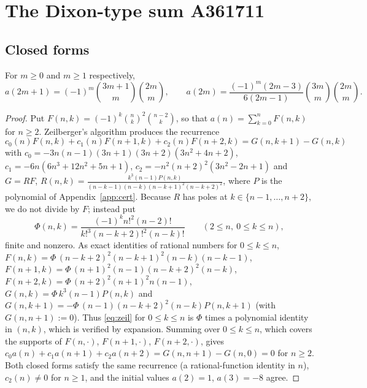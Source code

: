 \documentclass[11pt]{amsart}
\begin{document}
\section{The Dixon-type sum A361711}\label{sec:dixon}

\subsection{Closed forms}
\begin{lemma}\label{lem:closed}
For $m\ge0$ and $m\ge1$ respectively,
\[ a(2m+1)=(-1)^m\binom{3m+1}{m}\binom{2m}{m},\qquad a(2m)=\frac{(-1)^m(2m-3)}{6(2m-1)}\binom{3m}{m}\binom{2m}m. \]
\end{lemma}
\begin{proof}
Put $F(n,k)=(-1)^k\binom nk^2\binom{n-2}k$, so that $a(n)=\sum_{k=0}^nF(n,k)$ for $n\ge2$. Zeilberger's algorithm \cite{pwz1996} produces the recurrence
\begin{equation}\label{eq:zeil}
c_0(n)F(n,k)+c_1(n)F(n+1,k)+c_2(n)F(n+2,k)=G(n,k+1)-G(n,k)
\end{equation}
with $c_0=-3n(n-1)(3n+1)(3n+2)(3n^2+4n+2)$, $c_1=-6n(6n^3+12n^2+5n+1)$, $c_2=-n^2(n+2)^2(3n^2-2n+1)$ and $G=RF$, $R(n,k)=\frac{k^3(n-1)P(n,k)}{(n-k-1)(n-k)(n-k+1)^2(n-k+2)^2}$, where $P$ is the polynomial of Appendix~\ref{app:cert}. Because $R$ has poles at $k\in\{n-1,\dots,n+2\}$, we do not divide by $F$; instead put
\[ \Phi(n,k)=\frac{(-1)^kn!^2(n-2)!}{k!^3(n-k+2)!^2(n-k)!}\qquad(2\le n,\ 0\le k\le n), \]
finite and nonzero. As exact identities of rational numbers for $0\le k\le n$,
$F(n,k)=\Phi\,(n-k+2)^2(n-k+1)^2(n-k)(n-k-1)$, $F(n+1,k)=\Phi\,(n+1)^2(n-1)(n-k+2)^2(n-k)$, $F(n+2,k)=\Phi\,(n+2)^2(n+1)^2n(n-1)$, $G(n,k)=\Phi\,k^3(n-1)P(n,k)$ and $G(n,k+1)=-\Phi\,(n-1)(n-k+2)^2(n-k)P(n,k+1)$ (with $G(n,n+1):=0$). Thus \eqref{eq:zeil} for $0\le k\le n$ is $\Phi$ times a polynomial identity in $(n,k)$, which is verified by expansion. Summing over $0\le k\le n$, which covers the supports of $F(n,\cdot)$, $F(n+1,\cdot)$, $F(n+2,\cdot)$, gives $c_0a(n)+c_1a(n+1)+c_2a(n+2)=G(n,n+1)-G(n,0)=0$ for $n\ge2$. Both closed forms satisfy the same recurrence (a rational-function identity in $n$), $c_2(n)\ne0$ for $n\ge1$, and the initial values $a(2)=1$, $a(3)=-8$ agree.
\end{proof}
\end{document}
